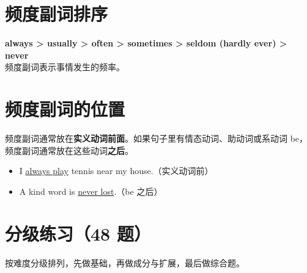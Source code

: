 \documentclass[11pt,a4paper]{ctexart}
\begin{document}
\section{频度副词排序}
\textbf{always > usually > often > sometimes > seldom (hardly ever) > never}\\
频度副词表示事情发生的频率。

\section{频度副词的位置}
频度副词通常放在\textbf{实义动词前面}。如果句子里有情态动词、助动词或系动词 be，频度副词通常放在这些动词\textbf{之后}。
\begin{itemize}[leftmargin=1.4em]
\item I \underline{always play} tennis near my house.（实义动词前）
\item A kind word is \underline{never lost}.（be 之后）
\end{itemize}


\newpage
\section{分级练习（48 题）}
\noindent 按难度分级排列，先做基础，再做成分与扩展，最后做综合题。
\end{document}
